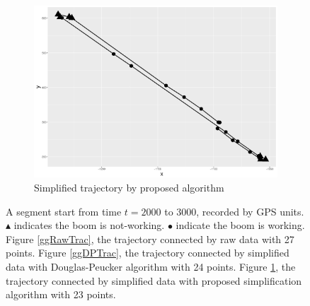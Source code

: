 \begin{figure}[h]
\begin{subfigure}[t]{0.47\textwidth}
\includegraphics[width=\linewidth]{Chapters/06Spinoff/plot/ggSPTrac.pdf}
\caption{Simplified trajectory by proposed algorithm}\label{ggSPTrac}
\end{subfigure}
\caption{A segment start from time $t=2000$ to $3000$, recorded by GPS units. $\blacktriangle$ indicates the boom is not-working. $\bullet$ indicate the boom is working. Figure \ref{ggRawTrac}, the trajectory connected by raw data with 27 points. Figure \ref{ggDPTrac}, the trajectory connected by simplified data with Douglas-Peucker algorithm with 24 points. Figure \ref{ggSPTrac}, the trajectory connected by simplified data with proposed simplification algorithm with 23  points.}\label{DataSimpRawTra}
\end{figure}

